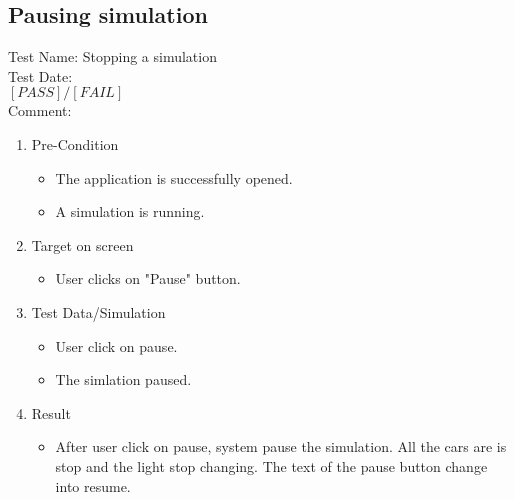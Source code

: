 \subsection{Pausing  simulation}
Test Name: Stopping a simulation\\Test Date: \\ $\left[ PASS \right] / \left[ FAIL \right]$\\Comment: \\
\begin{enumerate}
	\item Pre-Condition
	\begin{itemize}
		\item The application is successfully opened.
		\item A simulation is running.
	\end{itemize}
	\item Target on screen
	\begin{itemize}
		\item User clicks on "Pause" button.
	\end{itemize}
	\item Test Data/Simulation
	\begin{itemize}
		\item User click on pause.
		\item The simlation paused.
	\end{itemize}
	\item Result
	\begin{itemize}
		\item After user click on pause, system pause the simulation. All the cars are is stop and the light stop changing. The text of the pause button change into resume.
	\end{itemize}
\end{enumerate}

\newpage





